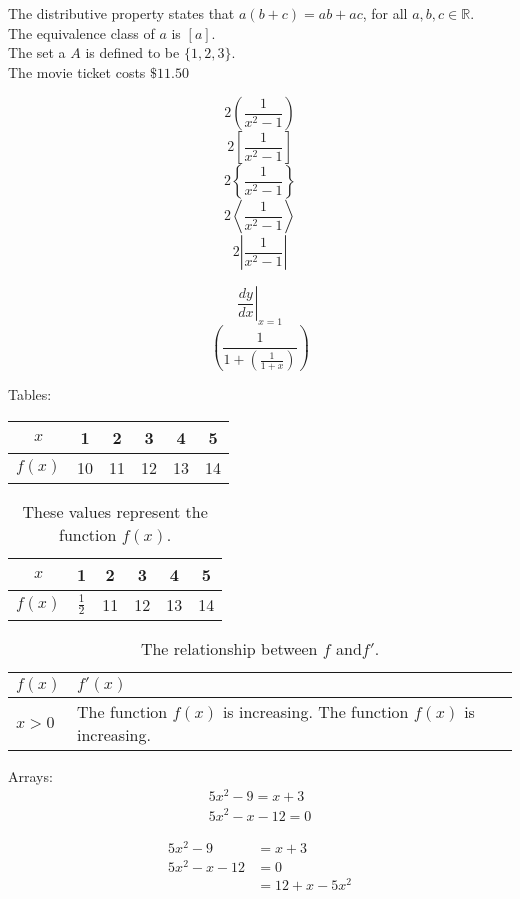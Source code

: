 \documentclass[11pt]{article}
\begin{document}
The distributive property states that $a(b+c)=ab+ac$, for all $a, b, c \in \mathbb{R}$.\\[6pt]
The equivalence class of $a$ is $[a]$.\\[6pt]
The set a $A$ is defined to be $\{1, 2, 3\}$.\\[6pt]
The movie ticket costs $\$11.50$

$$2\left(\frac{1}{x^2-1}\right)$$
$$2\left[\frac{1}{x^2-1}\right]$$
$$2\left\{\frac{1}{x^2-1}\right\}$$
$$2\left\langle\frac{1}{x^2-1}\right\rangle$$
$$2\left|\frac{1}{x^2-1}\right|$$

$$ \left.\frac{dy}{dx}\right|_{x=1}$$
$$ \left(\frac{1}{1+\left(\frac{1}{1+x}\right)}\right) $$

Tables:\\
\begin{tabular}{|c||c|c|c|c|c|}
	\hline
	$x$ & 1 & 2 & 3 & 4 & 5 \\ \hline
	$f(x)$ & 10 & 11 & 12 & 13 & 14 \\ \hline
\end{tabular}
\vspace{1cm}

\begin{table}[H]
	\centering
\def\arraystrech{1.5}
\begin{tabular}{|c||c|c|c|c|c|}
	\hline
	$x$ & 1 & 2 & 3 & 4 & 5 \\ \hline
	$f(x)$ & $\frac{1}{2}$ & 11 & 12 & 13 & 14 \\ \hline
\end{tabular}
\caption{These values represent the function $f(x)$.}
\end{table}

\begin{table}[H]
	\centering
\def\arraystrech{1.5}
\begin{tabular}{|l|p{3in}|}
	\hline
	$f(x)$ & $f'(x)$ \\ \hline
	$x>0$ & The function $f(x)$ is increasing. The function $f(x)$ is increasing.\\ \hline
\end{tabular}
\caption{The relationship between $f$ and$f'$.}
\end{table}

Arrays:
\begin{align}
5x^2-9=x+3\\
5x^2-x-12=0
\end{align}

\begin{align*}
	5x^2-9&=x+3\\
	5x^2-x-12&=0\\
					 &=12+x-5x^2
\end{align*}
\end{document}
